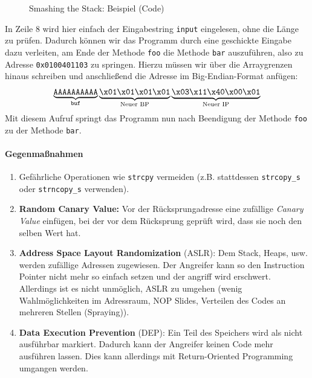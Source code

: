 \documentclass[a4paper, 11pt, accentcolor = tud3b]{tudreport}
\begin{document}
	                \begin{figure}[H]
	                	\centering
	                	
	                	\caption{Smashing the Stack: Beispiel (Code)}
	                \end{figure}
	                In Zeile 8 wird hier einfach der Eingabestring \texttt{input} eingelesen, ohne die Länge zu prüfen. Dadurch können wir das Programm durch eine geschickte Eingabe dazu verleiten, am Ende der Methode \texttt{foo} die Methode \texttt{bar} auszuführen, also zu Adresse \texttt{0x0100401103} zu springen. Hierzu müssen wir über die Arraygrenzen hinaus schreiben und anschließend die Adresse im Big-Endian-Format anfügen:
	                \begin{equation*}
	                	\underbrace{\texttt{AAAAAAAAAA}}_\text{\texttt{buf}}\underbrace{\texttt{\textbackslash{}x01\textbackslash{}x01\textbackslash{}x01\textbackslash{}x01}}_\text{Neuer BP}\underbrace{\texttt{\textbackslash{}x03\textbackslash{}x11\textbackslash{}x40\textbackslash{}x00\textbackslash{}x01}}_\text{Neuer IP}
	                \end{equation*}
	                Mit diesem Aufruf springt das Programm nun nach Beendigung der Methode \texttt{foo} zu der Methode \texttt{bar}.
	
	            \paragraph{Gegenmaßnahmen}
	                \begin{enumerate}
	                	\item Gefährliche Operationen wie \texttt{strcpy} vermeiden (z.B. stattdessen \texttt{strcopy\_s} oder \texttt{strncopy\_s} verwenden).
	                	\item \textbf{Random Canary Value:} Vor der Rücksprungadresse eine zufällige \textit{Canary Value} einfügen, bei der vor dem Rücksprung geprüft wird, dass sie noch den selben Wert hat.
	                	\item \textbf{Address Space Layout Randomization} (ASLR): Dem Stack, Heaps, usw. werden zufällige Adressen zugewiesen. Der Angreifer kann so den Instruction Pointer nicht mehr so einfach setzen und der angriff wird erschwert. Allerdings ist es nicht unmöglich, ASLR zu umgehen (wenig Wahlmöglichkeiten im Adressraum, NOP Slides, Verteilen des Codes an mehreren Stellen (Spraying)).
	                	\item \textbf{Data Execution Prevention} (DEP): Ein Teil des Speichers wird als nicht ausführbar markiert. Dadurch kann der Angreifer keinen Code mehr ausführen lassen. Dies kann allerdings mit Return-Oriented Programming umgangen werden.
	                \end{enumerate}
\end{document}
